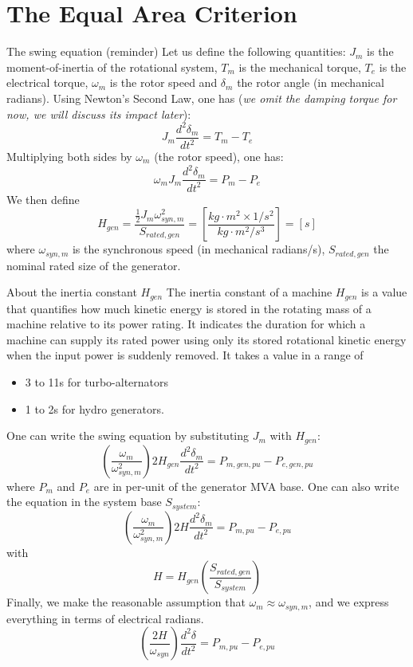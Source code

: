 \section{The Equal Area Criterion}
\begin{frame} [allowframebreaks]{The swing equation (reminder)}
Let us define the following quantities: $J_m$ is the moment-of-inertia of the rotational system, $T_m$ is the mechanical torque, $T_e$ is the electrical torque, $\omega_m$ is the rotor speed and $\delta_m$ the rotor angle (in mechanical radians). Using Newton's Second Law, one has (\textit{we omit the damping torque for now, we will discuss its impact later}):
$$J_m\frac{d^2\delta_m}{dt^2} = T_m-T_e$$
Multiplying both sides by $\omega_m$ (the rotor speed), one has:
$$\omega_m J_m \frac{d^2\delta_m}{dt^2} = P_m-P_e$$
We then define
$$H_{gen} = \frac{\frac{1}{2}J_m \omega_{syn,m}^2}{S_{rated,gen}} = \left[\frac{kg \cdot m^2 \times 1/s^2}{kg \cdot m^2/s^3}\right] = \left[s\right]$$
where $\omega_{syn,m}$ is the synchronous speed (in mechanical radians/s), $S_{rated,gen}$ the nominal rated size of the generator.

\begin{block}{About the inertia constant $H_{gen}$}
The inertia constant of a machine $H_{gen}$ is a value that quantifies how much kinetic energy is stored in the rotating mass of a machine relative to its power rating. 
It indicates the duration for which a machine can supply its rated power using only its stored rotational kinetic energy when the input power is suddenly removed.
It takes a value in a range of 
\begin{itemize}
    \item 3 to 11s for turbo-alternators
    \item 1 to 2s  for hydro generators.
\end{itemize} 
\end{block}


One can write the swing equation by substituting $J_m$ with $H_{gen}$:
$$\left(\frac{\omega_m}{\omega_{syn,m}^2}\right)2 H_{gen} \frac{d^2\delta_m}{dt^2} = P_{m,gen,pu} - P_{e,gen,pu}$$
where $P_m$ and $P_e$ are in per-unit of the generator MVA base. One can also write the equation in the system base $S_{system}$:
$$\left(\frac{\omega_m}{\omega_{syn,m}^2}\right)2 H \frac{d^2\delta_m}{dt^2} = P_{m,pu} - P_{e,pu}$$
with
$$H = H_{gen} \left(\frac{S_{rated,gen}}{S_{system}}\right)$$
Finally, we make the reasonable assumption that $\omega_m \approx \omega_{syn,m}$, and we express everything in terms of electrical radians.
\begin{equation}
\left(\frac{2H}{\omega_{syn}}\right) \frac{d^2\delta}{dt^2} = P_{m,pu} - P_{e,pu} \label{eq:swing}
\end{equation}

\end{frame}


